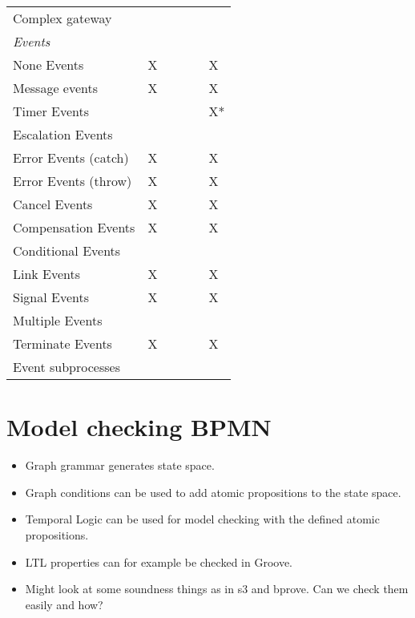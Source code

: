 \documentclass[adraft, copyright, creativecommons]{eptcs} %
\begin{document}
\begin{table}[h]
\begin{tabular}{l l l l l l}
      Complex gateway & & & & &\\
      \textit{Events} &  &  &  &  & \\
      None Events & X &  &  &  & X\\
      Message events & X &  &  &  & X\\
      Timer Events &  &  &  &  & X*\\
      Escalation Events & &  &  &  & \\
      Error Events (catch) & X &  &  &  & \color{yellow}X\\
      Error Events (throw) & X &  &  &  & \color{yellow}X\\
      Cancel Events & X &  &  &  & \color{yellow}X\\
      Compensation Events & X &  &  &  & \color{yellow}X\\
      Conditional Events &  &  &  &  & \\
      Link Events & X &  &  &  & X\\
      Signal Events & X &  &  &  & X\\
      Multiple Events &  &  &  &  & \\
      Terminate Events & X &  &  &  & X\\
      Event subprocesses &  &  &  &  & \\
    \end{tabular}

\end{table}

\section{Model checking BPMN}
\begin{itemize}
    \item Graph grammar generates state space.
    \item Graph conditions can be used to add atomic propositions to the state space.
    \item Temporal Logic can be used for model checking with the defined atomic propositions.
    \item LTL properties can for example be checked in Groove.
    \item Might look at some soundness things as in s3 and bprove. Can we check them easily and how?
\end{itemize}
\end{document}
